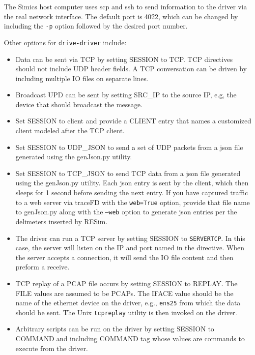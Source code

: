 \documentclass[titlepage]{article}
\begin{document}
The Simics host computer uses scp and ssh to send information to the driver via the real network interface.  The default port is 4022, which can be changed
by including the {\tt -p} option followed by the desired port number.

Other options for {\tt drive-driver} include:
\begin{itemize}
\item Data can be sent via TCP by setting SESSION to TCP.  TCP directives should not include UDP header fields.  A TCP conversation can be driven by
including multiple IO files on separate lines.

\item Broadcast UPD can be sent by setting SRC\_IP to the source IP, e.g, the device that should broadcast the message. 

\item Set SESSION to client and provide a CLIENT entry that names a customized client modeled after the TCP client.

\item Set SESSION to UDP\_JSON to send a set of UDP packets from a json file generated using the genJson.py utility.

\item Set SESSION to TCP\_JSON to send TCP data from a json file generated using the genJson.py utility.  Each json entry is sent by 
the client, which then sleeps for 1 second before sending the next entry.  If you have captured traffic to a web server via traceFD with
the {\tt web=True} option,
provide that file name to genJson.py along with the {\tt --web} option to generate json entries per the delimeters inserted by RESim.

\item The driver can run a TCP server by setting SESSION to {\tt SERVERTCP}.  In this case, the server will listen on the IP and port named in the directive.
When the server accepts a connection, it will send the IO file content and then preform a receive.  

\item TCP replay of a PCAP file occurs by setting SESSION to REPLAY.
The FILE values are assumed to be PCAPs.  The IFACE value should be the name of the ethernet device on the driver, e.g., {\tt ens25} from which the data 
should be sent.  The Unix {\tt tcpreplay} utility is then invoked on the driver.

\item Arbitrary scripts can be run on the driver by setting SESSION to COMMAND and including COMMAND tag whose values are commands to execute from the driver.


\end{itemize}
\end{document}
